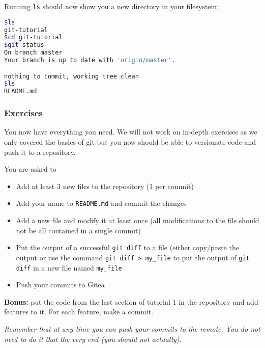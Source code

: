 \documentclass[12pt]{article}
\begin{document}
Running \texttt{ls} should now show you a new directory in your filesystem:

\begin{lstlisting}[language=bash]
$ls
git-tutorial
$cd git-tutorial
$git status
On branch master
Your branch is up to date with 'origin/master'.

nothing to commit, working tree clean
$ls
README.md
\end{lstlisting}


\subsubsection{Exercises}

You now have everything you need. We will not work on in-depth exercises as we only covered the basics of git but you now should be able to versionate code and push it to a repository.

You are asked to

\begin{itemize}
\item Add at least 3 new files to the repository (1 per commit)
\item Add your name to \texttt{README.md} and commit the changes
\item Add a new file and modify it at least once (all modifications to the file should not be all contained in a single commit)
\item Put the output of a successful \texttt{git diff} to a file (either copy/paste the output or use the command \texttt{git diff > my\_file} to put the output of \texttt{git diff} in a new file named \texttt{my\_file} 
\item Push your commits to Gitea
\end{itemize}

\textbf{Bonus:} put the code from the last section of tutorial 1 in the repository and add features to it. For each feature, make a commit.


\textit{Remember that at any time you can push your commits to the remote. You do not need to do it that the very end (you should not actually).}
\end{document}

